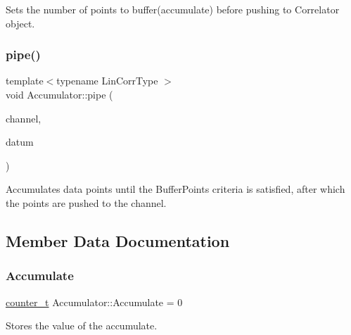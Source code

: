 Sets the number of points to buffer(accumulate) before pushing to Correlator object. 

\mbox{\label{classAccumulator_aa7494b569b7f4f2d2ab115e623ab135d}} 
\subsubsection{\texorpdfstring{pipe()}{pipe()}}
{\footnotesize\ttfamily template$<$typename Lin\+Corr\+Type $>$ \\
void Accumulator\+::pipe (\begin{DoxyParamCaption}\item[{Lin\+Corr\+Type \&}]{channel,  }\item[{const \hyperlink{types_8hpp_a22f279793847eba127de149437848c48}{counter\+\_\+t}}]{datum }\end{DoxyParamCaption})\hspace{0.3cm}{\ttfamily [inline]}}



Accumulates data points until the Buffer\+Points criteria is satisfied, after which the points are pushed to the channel. 



\subsection{Member Data Documentation}
\mbox{\label{classAccumulator_a8e615af8b85dd2c8500d1f8c473879ab}} 
\subsubsection{\texorpdfstring{Accumulate}{Accumulate}}
{\footnotesize\ttfamily \hyperlink{types_8hpp_a22f279793847eba127de149437848c48}{counter\+\_\+t} Accumulator\+::\+Accumulate = 0\hspace{0.3cm}{\ttfamily [private]}}



Stores the value of the accumulate. 

\mbox{\label{classAccumulator_a6e4595169413a77122fe56cdd39137ae}} 
